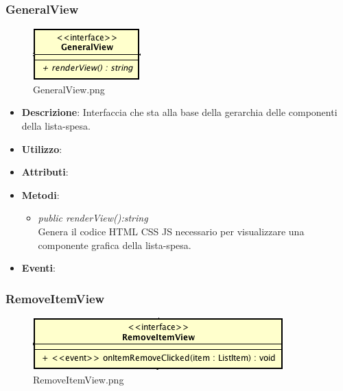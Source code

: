 \subsubsection{GeneralView}

\label{GeneralView}
\begin{figure}[ht]
	\centering
	\includegraphics[scale=0.5]{Sezioni/SottosezioniST/img/app/GeneralView.png}
	\caption{GeneralView.png}
\end{figure}

\begin{itemize}
\item \textbf{Descrizione}: Interfaccia che sta alla base della gerarchia delle componenti della lista-spesa.
\item \textbf{Utilizzo}:
\item \textbf{Attributi}: 
\item \textbf{Metodi}:
	\begin{itemize}
	\item \textit{public renderView():string}\\
	Genera il codice HTML CSS JS necessario per visualizzare una componente grafica della lista-spesa.
	\end{itemize}
\item \textbf{Eventi}:
\end{itemize}

\subsubsection{RemoveItemView}

\label{RemoveItemView}
\begin{figure}[ht]
	\centering
	\includegraphics[scale=0.5]{Sezioni/SottosezioniST/img/app/RemoveItemView.png}
	\caption{RemoveItemView.png}
\end{figure}

